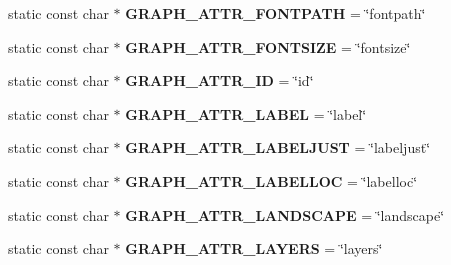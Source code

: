 \begin{DoxyCompactItemize}
\item 
static const char $\ast$ {\bfseries G\+R\+A\+P\+H\+\_\+\+A\+T\+T\+R\+\_\+\+F\+O\+N\+T\+P\+A\+TH} = \char`\"{}fontpath\char`\"{}\hypertarget{classmemgraph_1_1_graphviz_attrs_abeb359445879cafdbda9abda4f506378}{}\label{classmemgraph_1_1_graphviz_attrs_abeb359445879cafdbda9abda4f506378}

\item 
static const char $\ast$ {\bfseries G\+R\+A\+P\+H\+\_\+\+A\+T\+T\+R\+\_\+\+F\+O\+N\+T\+S\+I\+ZE} = \char`\"{}fontsize\char`\"{}\hypertarget{classmemgraph_1_1_graphviz_attrs_af1624c4dd011269cd902c9816b0d850a}{}\label{classmemgraph_1_1_graphviz_attrs_af1624c4dd011269cd902c9816b0d850a}

\item 
static const char $\ast$ {\bfseries G\+R\+A\+P\+H\+\_\+\+A\+T\+T\+R\+\_\+\+ID} = \char`\"{}id\char`\"{}\hypertarget{classmemgraph_1_1_graphviz_attrs_a3c7932955474f4b266c8bd0bb3176852}{}\label{classmemgraph_1_1_graphviz_attrs_a3c7932955474f4b266c8bd0bb3176852}

\item 
static const char $\ast$ {\bfseries G\+R\+A\+P\+H\+\_\+\+A\+T\+T\+R\+\_\+\+L\+A\+B\+EL} = \char`\"{}label\char`\"{}\hypertarget{classmemgraph_1_1_graphviz_attrs_a91f3616546ec25d048344d19b5822144}{}\label{classmemgraph_1_1_graphviz_attrs_a91f3616546ec25d048344d19b5822144}

\item 
static const char $\ast$ {\bfseries G\+R\+A\+P\+H\+\_\+\+A\+T\+T\+R\+\_\+\+L\+A\+B\+E\+L\+J\+U\+ST} = \char`\"{}labeljust\char`\"{}\hypertarget{classmemgraph_1_1_graphviz_attrs_a84bc42cde0c27f7b8a0d17c706a2ea3f}{}\label{classmemgraph_1_1_graphviz_attrs_a84bc42cde0c27f7b8a0d17c706a2ea3f}

\item 
static const char $\ast$ {\bfseries G\+R\+A\+P\+H\+\_\+\+A\+T\+T\+R\+\_\+\+L\+A\+B\+E\+L\+L\+OC} = \char`\"{}labelloc\char`\"{}\hypertarget{classmemgraph_1_1_graphviz_attrs_a4d159dfca46a7ed39b1b436505817d03}{}\label{classmemgraph_1_1_graphviz_attrs_a4d159dfca46a7ed39b1b436505817d03}

\item 
static const char $\ast$ {\bfseries G\+R\+A\+P\+H\+\_\+\+A\+T\+T\+R\+\_\+\+L\+A\+N\+D\+S\+C\+A\+PE} = \char`\"{}landscape\char`\"{}\hypertarget{classmemgraph_1_1_graphviz_attrs_a075c03b42842b123db18ab10d19f2d41}{}\label{classmemgraph_1_1_graphviz_attrs_a075c03b42842b123db18ab10d19f2d41}

\item 
static const char $\ast$ {\bfseries G\+R\+A\+P\+H\+\_\+\+A\+T\+T\+R\+\_\+\+L\+A\+Y\+E\+RS} = \char`\"{}layers\char`\"{}\hypertarget{classmemgraph_1_1_graphviz_attrs_afc89efd93c68be6a89eb82874db29854}{}\label{classmemgraph_1_1_graphviz_attrs_afc89efd93c68be6a89eb82874db29854}


\end{DoxyCompactItemize}
